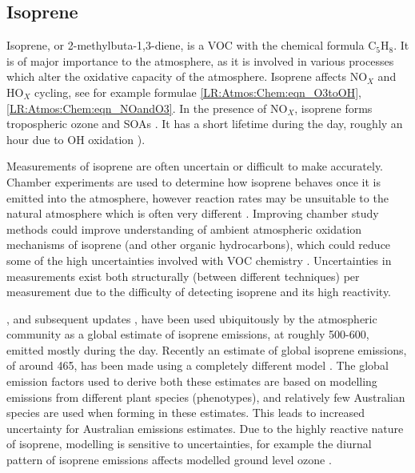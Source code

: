     
    
    
    
    
    
  \subsection{Isoprene}
  \label{LR:VOCs:Isop}
    Isoprene, or 2-methylbuta-1,3-diene, is a VOC with the chemical formula C$_5$H$_8$. 
    It is of major importance to the atmosphere, as it is involved in various processes which alter the oxidative capacity of the atmosphere.
    Isoprene affects NO$_X$ and HO$_X$ cycling, see for example formulae \ref{LR:Atmos:Chem:eqn_O3toOH}, \ref{LR:Atmos:Chem:eqn_NOandO3}.
    In the presence of NO$_X$, isoprene forms tropospheric ozone and SOAs \parencite{Wagner2002, Millet2006}.
    It has a short lifetime during the day, roughly an hour due to OH oxidation \parencite{AtkinsonArey2003}).
    
    Measurements of isoprene are often uncertain or difficult to make accurately.
    Chamber experiments are used to determine how isoprene behaves once it is emitted into the atmosphere, however reaction rates may be unsuitable to the natural atmosphere which is often very different \parencite{Kanakidou2005,Nguyen2014}.
    Improving chamber study methods could improve understanding of ambient atmospheric oxidation mechanisms of isoprene (and other organic hydrocarbons), which could reduce some of the high uncertainties involved with VOC chemistry \parencite{Nguyen2014}.
    Uncertainties in measurements exist both structurally (between different techniques) per measurement due to the difficulty of detecting isoprene and its high reactivity.
    
    \textcite{Guenther1995}, and subsequent updates \parencite{Guenther2000,Guenther2006,Guenther2012}, have been used ubiquitously by the atmospheric community as a global estimate of isoprene emissions, at roughly 500-600\tgpyr, emitted mostly during the day.
    Recently an estimate of global isoprene emissions, of around 465\tgcpyr, has been made using a completely different model \parencite{Messina2016}.
    The global emission factors used to derive both these estimates are based on modelling emissions from different plant species (phenotypes), and relatively few Australian species are used when forming in these estimates.
    This leads to increased uncertainty for Australian emissions estimates.
    Due to the highly reactive nature of isoprene, modelling is sensitive to uncertainties, for example the diurnal pattern of isoprene emissions affects modelled ground level ozone \parencite{Hewitt2011, Fan2004}.
    
